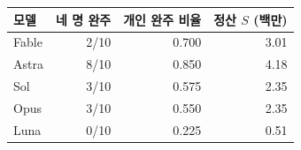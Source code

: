 \begin{tabular}{@{}lrrr@{}}
\toprule
모델 & 네 명 완주 & 개인 완주 비율 & 정산 $S$ (백만) \\
\midrule
Fable & 2/10 & 0.700 & 3.01 \\
Astra & 8/10 & 0.850 & 4.18 \\
Sol & 3/10 & 0.575 & 2.35 \\
Opus & 3/10 & 0.550 & 2.35 \\
Luna & 0/10 & 0.225 & 0.51 \\
\bottomrule
\end{tabular}
